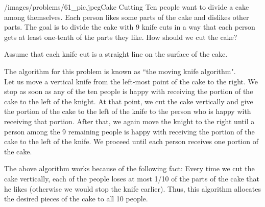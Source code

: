 \begin{problem}{/images/problems/61_pic.jpeg}{Cake Cutting} Ten people want to divide a cake among themselves. Each person likes some parts of the cake and dislikes other parts. The goal is to divide the cake with 9 knife cuts in a way that each person gets at least one-tenth of the parts they like. How should we cut the cake?
	
Assume that each knife cut is a straight line on the surface of the cake.
\end{problem}
\begin{solution}
	The algorithm for this problem is known as ``the moving knife algorithm".\\[0.2cm]
	
	Let us move a vertical knife from the left-most point of the cake to the right. We stop as soon as any of the ten people is happy with receiving the portion of the cake to the left of the knight. At that point, we cut the cake vertically and give the portion of the cake to the left of the knife to the person who is happy with receiving that portion. After that, we again move the knight to the right until a person among the 9 remaining people is happy with receiving the portion of the cake to the left of the knife. We proceed until each person receives one portion of the cake.
	
	The above algorithm works because of the following fact: Every time we cut the cake vertically, each of the people loses at most 1/10 of the parts of the cake that he likes (otherwise we would stop the knife earlier). Thus, this algorithm allocates the desired pieces of the cake to all 10 people.
\end{solution}

